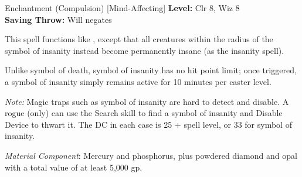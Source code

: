 {Enchantment (Compulsion) [Mind-Affecting]}
{
	\textbf{Level:}
	Clr 8, Wiz 8\\
	\textbf{Saving Throw:}
	Will negates\\
}
{
	This spell functions like , except that all creatures within the radius of the symbol of insanity instead become permanently insane (as the insanity spell).

	Unlike symbol of death, symbol of insanity has no hit point limit; once triggered, a symbol of insanity simply remains active for 10 minutes per caster level.

	\textit{Note:} Magic traps such as symbol of insanity are hard to detect and disable. A rogue (only) can use the Search skill to find a symbol of insanity and Disable Device to thwart it. The DC in each case is 25 + spell level, or 33 for symbol of insanity.

	\textit{Material Component}:
	Mercury and phosphorus, plus powdered diamond and opal with a total value of at least 5,000 gp.

}
